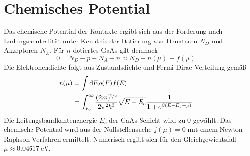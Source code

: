 \section{Chemisches Potential }
\label{sec:A_3}
Das chemische Potential der Kontakte ergibt sich aus der Forderung nach Ladungsneutralität unter Kenntnis der Dotierung von Donatoren $N_D$ und Akzeptoren $N_A$. Für $n$-dotiertes GaAs gilt demnach
\begin{equation}
  0 = N_D - p + N_A - n \approx N_D - n(\mu) \equiv f(\mu)
\end{equation}
Die Elektronendichte folgt aus Zustandsdichte und Fermi-Dirac-Verteilung gemäß
\begin{align}
  n(\mu) &= \int\mathop{}\!\mathrm{d} E \rho(E) f(E) \\
   &= \int_{E_c}^{\infty}\frac{(2m)^{\nicefrac{3}{2}} }{2\pi^2\hbar^3}\sqrt{E-E_c} \frac{1}{1+e^{\beta(E-E_c-\mu)}}
\end{align}
Die Leitungsbandkantenenergie $E_c$ der GaAs-Schicht wird zu 0 gewählt. Das chemische Potential wird aus der Nullstellensuche $f(\mu)=0$ mit einem Newton-Raphson-Verfahren ermittelt. Numerisch ergibt sich für den Gleichgewichtsfall  $\mu\approx\SI{0.04617}{\electronvolt}$.

